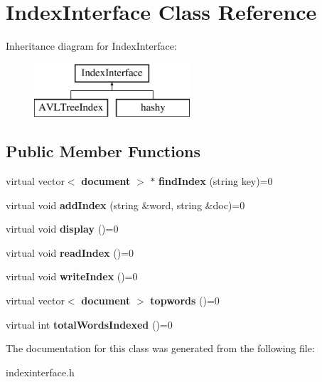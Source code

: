 \section{Index\+Interface Class Reference}
\label{class_index_interface}
Inheritance diagram for Index\+Interface\+:\begin{figure}[H]
\begin{center}
\leavevmode
\includegraphics[height=2.000000cm]{class_index_interface}
\end{center}
\end{figure}
\subsection*{Public Member Functions}
\begin{DoxyCompactItemize}
\item 
virtual vector$<$ {\bf document} $>$ $\ast$ {\bfseries find\+Index} (string key)=0\label{class_index_interface_a2f50625affbeda31e1314664f4a1af98}

\item 
virtual void {\bfseries add\+Index} (string \&word, string \&doc)=0\label{class_index_interface_ae3a511e458f11529f3c8cb82dcf81e23}

\item 
virtual void {\bfseries display} ()=0\label{class_index_interface_a09a2aef2e093bf1d4b34bffa89382aa5}

\item 
virtual void {\bfseries read\+Index} ()=0\label{class_index_interface_ab17e509ad40bfc8c0f90e8382c8e9931}

\item 
virtual void {\bfseries write\+Index} ()=0\label{class_index_interface_a6d924312167449866fdc747839cc37eb}

\item 
virtual vector$<$ {\bf document} $>$ {\bfseries topwords} ()=0\label{class_index_interface_ac48997ed829d72743a7d96f95d6c69fe}

\item 
virtual int {\bfseries total\+Words\+Indexed} ()=0\label{class_index_interface_a5a267a6d18eb64b8d5928b1c3e9f8cd9}

\end{DoxyCompactItemize}


The documentation for this class was generated from the following file\+:\begin{DoxyCompactItemize}
\item 
indexinterface.\+h\end{DoxyCompactItemize}
